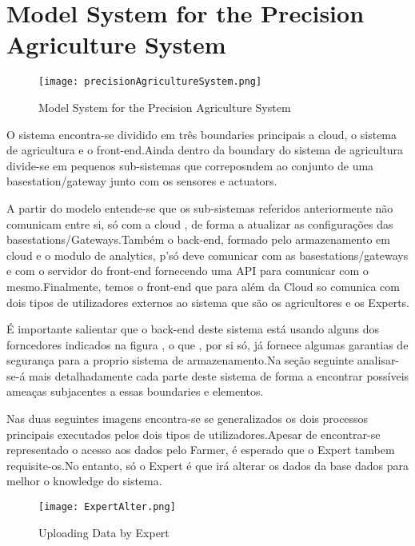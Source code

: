 \section{Model System for the Precision Agriculture System}

\begin{figure}[h!]

	\centering

 	\texttt{[image: precisionAgricultureSystem.png]}

 	\caption {Model System for the Precision Agriculture System}

  	\label{fig01}
\end{figure}

	O sistema encontra-se dividido em três boundaries principais a cloud, o sistema de agricultura e o front-end.Ainda dentro da boundary do sistema de agricultura divide-se em pequenos sub-sistemas que correposndem ao conjunto de uma basestation/gateway junto com os sensores e actuators.

	A partir do modelo entende-se que os sub-sistemas referidos anteriormente não comunicam entre si, só com a cloud , de forma a atualizar as configurações das basestations/Gateways.Também o back-end, formado pelo armazenamento em cloud e o modulo de analytics, p'só deve comunicar com as basestations/gateways e com o servidor do front-end fornecendo uma API para comunicar com o mesmo.Finalmente, temos o front-end que para além da Cloud so comunica com dois tipos de utilizadores externos ao sistema que são os agricultores e os Experts.

	É importante salientar que o back-end deste sistema está usando alguns dos forncedores indicados na figura , o que , por si só, já fornece algumas garantias de segurança para a proprio sistema de armazenamento.Na seção seguinte analisar-se-á mais detalhadamente cada parte deste sistema de forma a encontrar possíveis ameaças subjacentes a essas boundaries e elementos.

	Nas duas seguintes imagens encontra-se se generalizados os dois processos principais executados pelos dois tipos de utilizadores.Apesar de encontrar-se representado o acesso aos dados pelo Farmer, é esperado que o Expert tambem requisite-os.No entanto, só o Expert é que irá alterar os dados da base dados para melhor o knowledge do sistema.

\begin{figure}[h!]

	\centering

 	\texttt{[image: ExpertAlter.png]}

 	\caption {Uploading Data by Expert}

  	\label{fig02}
\end{figure}



